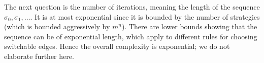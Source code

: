 The next question is the number of iterations, meaning the length of the sequence
$\sigma_0,\sigma_1,\dots$. It is at most exponential since it is bounded by the number of strategies (which is bounded aggressively by $m^n$).
There are lower bounds showing that the sequence can be of exponential length, which apply to different rules for choosing switchable edges.
Hence the overall complexity is exponential; we do not elaborate further here. 
